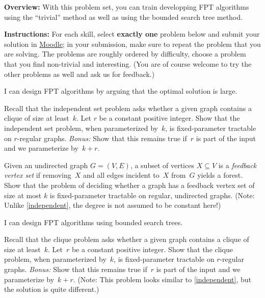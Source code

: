 \documentclass[english]{uebung_cs}
\begin{document}
\textbf{Overview:} With this problem set, you can train developping FPT algorithms using the \enquote{trivial} method as well as using the bounded search tree method.

\textbf{Instructions:} For each skill, select \textbf{exactly one} problem below and submit your solution in \href{https://moodle.studiumdigitale.uni-frankfurt.de/moodle/course/view.php?id=6259}{Moodle}; in your submission, make sure to repeat the problem that you are solving.
The problems are roughly ordered by difficulty, choose a problem that you find non-trivial and interesting. (You are of course welcome to try the other problems as well and ask us for feedback.)


\begin{skill}
  I can design FPT algorithms by arguing that the optimal solution is large.
\end{skill}

\begin{exercise}\label{independent}
  Recall that the independent set problem asks whether a given graph contains a clique of size at least~$k$.
  Let $r$ be a constant positive integer.
  Show that the independent set problem, when parameterized by~$k$, is fixed-parameter tractable on $r$-regular graphs.
  \emph{Bonus:} Show that this remains true if~$r$ is part of the input and we parameterize by~$k+r$.
\end{exercise}

\begin{exercise}
  Given an undirected graph $G = (V, E)$, a subset of vertices $X \subseteq V$ is a \emph{feedback vertex
  set} if removing~$X$ and all edges incident to~$X$ from~$G$ yields a forest. Show that the problem of deciding
  whether a graph has a feedback vertex set of size at most $k$ is fixed-parameter tractable on regular,
  undirected graphs. (Note: Unlike \ref{independent}, the degree is not assumed to be constant here!)
\end{exercise}


\begin{skill}
  I can design FPT algorithms using bounded search trees.
\end{skill}

  \begin{exercise}\label{clique}
    Recall that the clique problem asks whether a given graph contains a clique of size at least~$k$.
    Let~$r$ be a constant positive integer.
    Show that the clique problem, when parameterized by~$k$, is fixed-parameter tractable on $r$-regular graphs.
    \emph{Bonus:} Show that this remains true if~$r$ is part of the input and we parameterize by~$k+r$. (Note: This problem looks similar to \ref{independent}, but the solution is quite different.)
  \end{exercise}
\end{document}
